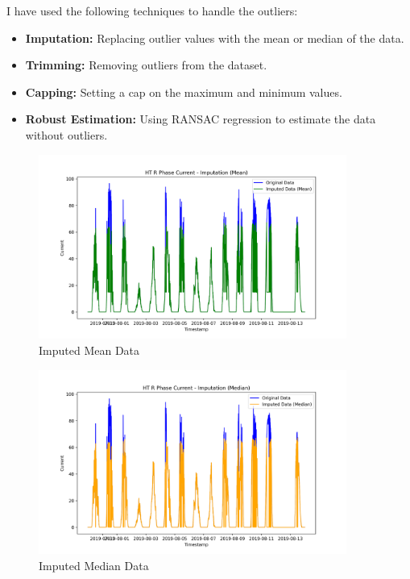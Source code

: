 I have used the following techniques to handle the outliers:

\begin{itemize}
	\item \textbf{Imputation:} Replacing outlier values with the mean or median of the data.
	\item \textbf{Trimming:} Removing outliers from the dataset.
	\item \textbf{Capping:} Setting a cap on the maximum and minimum values.
	\item \textbf{Robust Estimation:} Using RANSAC regression to estimate the data without outliers.
\end{itemize}


\begin{figure}[H]
	\centering
	\includegraphics[width=0.9\textwidth]{./Images/imputed_mean_data.png}
	\caption{Imputed Mean Data}
\end{figure}

\begin{figure}[H]
	\centering
	\includegraphics[width=0.9\textwidth]{./Images/imputed_median_data.png}
	\caption{Imputed Median Data}
\end{figure}

